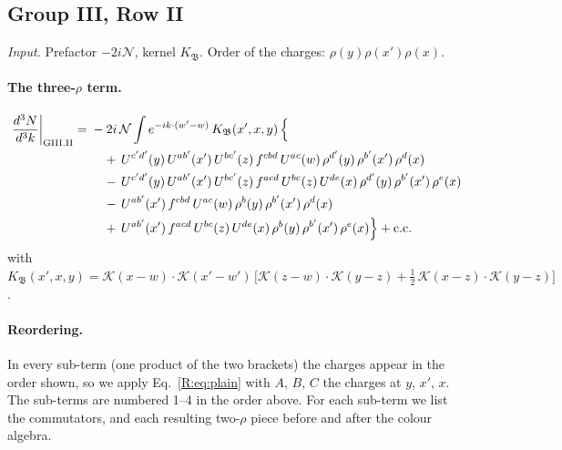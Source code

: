 \documentclass[10pt]{article}
\numberwithin{equation}{section}
\newcommand{\KK}{\mathcal K}
\newcommand{\NN}{\mathcal N}
\begin{document}
\subsection{Group III, Row II}\label{R:sec:GIII.II}
\emph{Input.} Prefactor $-2i\NN$, kernel $K_{\mathfrak B}$. Order of the charges: $\rho(y)\rho(x')\rho(x)$.
\paragraph{The three-$\rho$ term.}
\begin{align}
\frac{d^3N}{d^3k}\bigg|_{\rm GIII.II}={}&-2i\,\NN\int e^{-ik\cdot(w'-w)}\,K_{\mathfrak B}(x',x,y)\,\Big\{\notag\\
&\quad +\,U^{c'd'}(y)\,U^{ab'}(x')\,U^{bc'}(z)\,f^{cbd}\,U^{ac}(w)\,\rho^{d'}(y)\,\rho^{b'}(x')\,\rho^{d}(x)\notag\\
&\quad -\,U^{c'd'}(y)\,U^{ab'}(x')\,U^{bc'}(z)\,f^{acd}\,U^{bc}(z)\,U^{de}(x)\,\rho^{d'}(y)\,\rho^{b'}(x')\,\rho^{e}(x)\notag\\
&\quad -\,U^{ab'}(x')\,f^{cbd}\,U^{ac}(w)\,\rho^{b}(y)\,\rho^{b'}(x')\,\rho^{d}(x)\notag\\
&\quad +\,U^{ab'}(x')\,f^{acd}\,U^{bc}(z)\,U^{de}(x)\,\rho^{b}(y)\,\rho^{b'}(x')\,\rho^{e}(x)\Big\}+{\rm c.c.}\label{R:eq:in-GIII.II}
\end{align}
with $K_{\mathfrak B}(x',x,y)=\KK(x-w)\cdot\KK(x'-w')\,\Big[\KK(z-w)\cdot\KK(y-z)+\tfrac12\,\KK(x-z)\cdot\KK(y-z)\Big]$.
\paragraph{Reordering.} In every sub-term (one product of the two brackets) the charges appear in the order shown, so we apply Eq.~\eqref{R:eq:plain} with $A$, $B$, $C$ the charges at $y$, $x'$, $x$. The sub-terms are numbered 1--4 in the order above. For each sub-term we list the commutators, and each resulting two-$\rho$ piece before and after the colour algebra.
\end{document}
